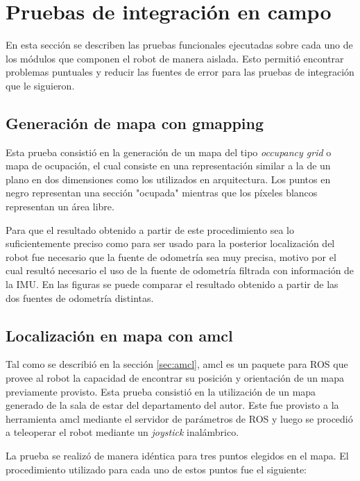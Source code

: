 \section{Pruebas de integración en campo}

En esta sección se describen las pruebas funcionales ejecutadas sobre cada uno de los módulos que componen el robot de manera aislada. Esto permitió encontrar problemas puntuales y reducir las fuentes de error para las pruebas de integración que le siguieron.

\subsection{Generación de mapa con gmapping}

Esta prueba consistió en la generación de un mapa del tipo \textit{occupancy grid} o mapa de ocupación, el cual consiste en una representación similar a la de un plano en dos dimensiones como los utilizados en arquitectura. Los puntos en negro representan una sección "ocupada" mientras que los píxeles blancos representan un área libre.

Para que el resultado obtenido a partir de este procedimiento sea lo suficientemente preciso como para ser usado para la posterior localización del robot fue necesario que la fuente de odometría sea muy precisa, motivo por el cual resultó necesario el uso de la fuente de odometría filtrada con información de la IMU. En las figuras se puede comparar el resultado obtenido a partir de las dos fuentes de odometría distintas.


\subsection{Localización en mapa con amcl}

Tal como se describió en la sección \ref{sec:amcl}, amcl es un paquete para ROS que provee al robot la capacidad de encontrar su posición y orientación de un mapa previamente provisto. Esta prueba consistió en la utilización de un mapa generado de la sala de estar del departamento del autor. Este fue provisto a la herramienta amcl mediante el servidor de parámetros de ROS y luego se procedió a teleoperar el robot mediante un \textit{joystick} inalámbrico.

La prueba se realizó de manera idéntica para tres puntos elegidos en el mapa. El procedimiento utilizado para cada uno de estos puntos fue el siguiente:


